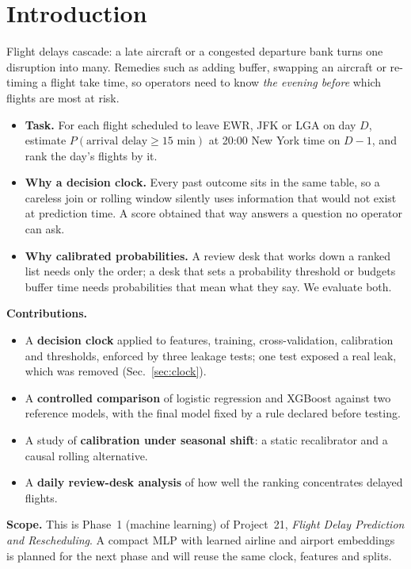 \documentclass[conference]{IEEEtran}
\begin{document}
\section{Introduction}\label{sec:intro}
Flight delays cascade: a late aircraft or a congested departure bank turns one disruption into many. Remedies such as adding buffer, swapping an aircraft or re-timing a flight take time, so operators need to know \emph{the evening before} which flights are most at risk.
\begin{itemize}
\item \textbf{Task.} For each flight scheduled to leave EWR, JFK or LGA on day $D$, estimate $P(\text{arrival delay}\ge15\text{ min})$ at 20:00 New York time on $D-1$, and rank the day's flights by it.
\item \textbf{Why a decision clock.} Every past outcome sits in the same table, so a careless join or rolling window silently uses information that would not exist at prediction time. A score obtained that way answers a question no operator can ask.
\item \textbf{Why calibrated probabilities.} A review desk that works down a ranked list needs only the order; a desk that sets a probability threshold or budgets buffer time needs probabilities that mean what they say. We evaluate both.
\end{itemize}

\textbf{Contributions.}
\begin{itemize}
\item A \textbf{decision clock} applied to features, training, cross-validation, calibration and thresholds, enforced by three leakage tests; one test exposed a real leak, which was removed (Sec.~\ref{sec:clock}).
\item A \textbf{controlled comparison} of logistic regression and XGBoost against two reference models, with the final model fixed by a rule declared before testing.
\item A study of \textbf{calibration under seasonal shift}: a static recalibrator and a causal rolling alternative.
\item A \textbf{daily review-desk analysis} of how well the ranking concentrates delayed flights.
\end{itemize}
\textbf{Scope.} This is Phase~1 (machine learning) of Project~21, \emph{Flight Delay Prediction and Rescheduling}. A compact MLP with learned airline and airport embeddings is planned for the next phase and will reuse the same clock, features and splits.
\end{document}
